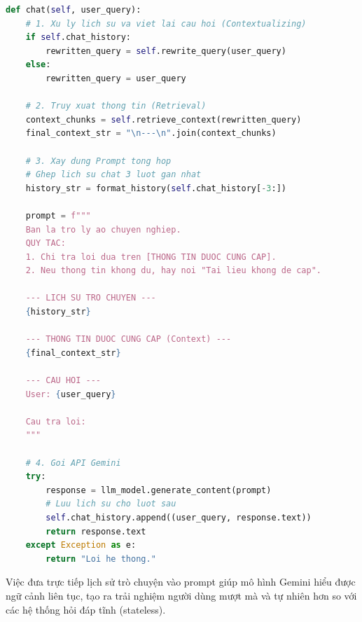 \begin{lstlisting}[language=Python, caption={Hàm tạo sinh câu trả lời có ngữ cảnh lịch sử}, label={lst:gemini_gen}]
def chat(self, user_query):
    # 1. Xu ly lich su va viet lai cau hoi (Contextualizing)
    if self.chat_history:
        rewritten_query = self.rewrite_query(user_query)
    else:
        rewritten_query = user_query
    
    # 2. Truy xuat thong tin (Retrieval)
    context_chunks = self.retrieve_context(rewritten_query)
    final_context_str = "\n---\n".join(context_chunks)
    
    # 3. Xay dung Prompt tong hop
    # Ghep lich su chat 3 luot gan nhat
    history_str = format_history(self.chat_history[-3:])
    
    prompt = f"""
    Ban la tro ly ao chuyen nghiep.
    QUY TAC:
    1. Chi tra loi dua tren [THONG TIN DUOC CUNG CAP].
    2. Neu thong tin khong du, hay noi "Tai lieu khong de cap".
    
    --- LICH SU TRO CHUYEN ---
    {history_str}
    
    --- THONG TIN DUOC CUNG CAP (Context) ---
    {final_context_str}
    
    --- CAU HOI ---
    User: {user_query}
    
    Cau tra loi:
    """
    
    # 4. Goi API Gemini
    try:
        response = llm_model.generate_content(prompt)
        # Luu lich su cho luot sau
        self.chat_history.append((user_query, response.text))
        return response.text
    except Exception as e:
        return "Loi he thong."
\end{lstlisting}

Việc đưa trực tiếp lịch sử trò chuyện vào prompt giúp mô hình Gemini hiểu được ngữ cảnh liên tục, tạo ra trải nghiệm người dùng mượt mà và tự nhiên hơn so với các hệ thống hỏi đáp tĩnh (stateless).